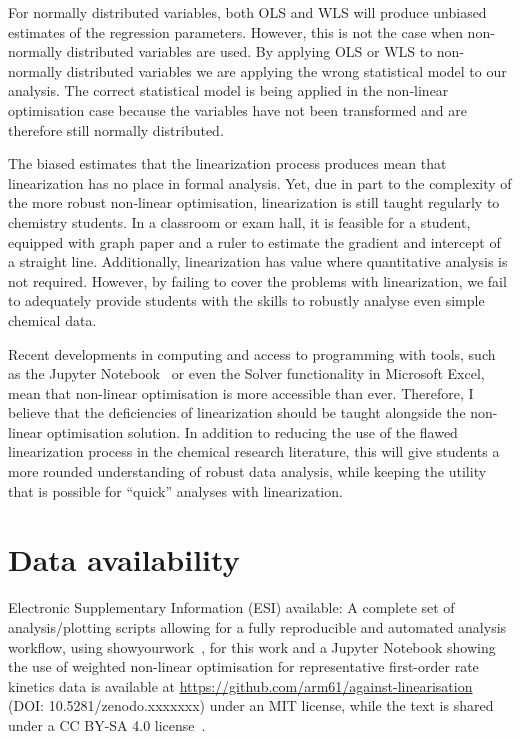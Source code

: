 \documentclass[journal=jceda8,manuscript=article]{achemso}
\begin{document}
For normally distributed variables, both OLS and WLS will produce unbiased estimates of the regression parameters. 
However, this is not the case when non-normally distributed variables are used. 
By applying OLS or WLS to non-normally distributed variables we are applying the wrong statistical model to our analysis. 
The correct statistical model is being applied in the non-linear optimisation case because the variables have not been transformed and are therefore still normally distributed. 

The biased estimates that the linearization process produces mean that linearization has no place in formal analysis. 
Yet, due in part to the complexity of the more robust non-linear optimisation, linearization is still taught regularly to chemistry students. 
In a classroom or exam hall, it is feasible for a student, equipped with graph paper and a ruler to estimate the gradient and intercept of a straight line. 
Additionally, linearization has value where quantitative analysis is not required. 
However, by failing to cover the problems with linearization, we fail to adequately provide students with the skills to robustly analyse even simple chemical data. 

Recent developments in computing and access to programming with tools, such as the Jupyter Notebook~\cite{kluyver_jupyter_2016} or even the Solver functionality in Microsoft Excel, mean that non-linear optimisation is more accessible than ever. 
Therefore, I believe that the deficiencies of linearization should be taught alongside the non-linear optimisation solution. 
In addition to reducing the use of the flawed linearization process in the chemical research literature, this will give students a more rounded understanding of robust data analysis, while keeping the utility that is possible for ``quick'' analyses with linearization.

\section*{Data availability}

Electronic Supplementary Information (ESI) available: A complete set of analysis/plotting scripts allowing for a fully reproducible and automated analysis workflow, using showyourwork~\cite{luger_showyourwork_2021}, for this work and a Jupyter Notebook showing the use of weighted non-linear optimisation for representative first-order rate kinetics data is available at \url{https://github.com/arm61/against-linearisation} (DOI: 10.5281/zenodo.xxxxxxx) under an MIT license, while the text is shared under a CC BY-SA 4.0 license~\cite{mccluskey_github_2023}.
\end{document}
